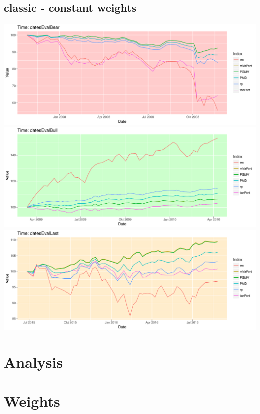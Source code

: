 \documentclass{scrbook}
\begin{document}
\subsection{classic - constant weights}
\includegraphics[width=\textwidth]{Performance-Classic-datesEvalBear.pdf}
\includegraphics[width=\textwidth]{Performance-Classic-datesEvalBull.pdf}
\includegraphics[width=\textwidth]{Performance-Classic-datesEvalLast.pdf}






\clearpage
\section{Analysis}





\clearpage
\section{Weights}



\end{document}
